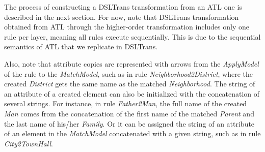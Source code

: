 %

The process of constructing a DSLTrans transformation from an ATL one is described in the next section.
For now, note that DSLTrans transformation obtained from ATL through the higher-order transformation includes only one rule per layer, meaning all rules execute sequentially.
This is due to the sequential semantics of ATL that we replicate in DSLTrans.


Also, note that attribute copies are represented with arrows from the \emph{ApplyModel} of the rule to the \emph{MatchModel}, such as in rule \emph{Neighborhood2District}, where the created \emph{District} gets the same name as the matched \emph{Neighborhood}.
The string of an attribute of a created element can also be initialized with the concatenation of several strings.
For instance, in rule \emph{Father2Man}, the full name of the created \emph{Man} comes from the concatenation of the first name of the matched \emph{Parent} and the last name of his/her \emph{Family}.
Or it can be assigned the string of an attribute of an element in the \emph{MatchModel} concatenated with a given string, such as in rule \emph{City2TownHall}.





